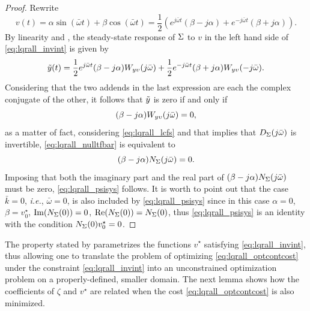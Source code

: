 \begin{proof}
	Rewrite
	\begin{equation}
			v(t) = \alpha \sin(\bar{\omega}t) + \beta \cos(\bar{\omega}t) = \frac{1}{2} \left( e^{j\bar{\omega} t} (\beta - j\alpha) + e^{-j\bar{\omega} t} (\beta + j\alpha) \right).
	\end{equation}
	By linearity and , the steady-state response of $\Sigma$ to $v$ in the left hand side of \eqref{eq:lqrall_invint} is given by
	\begin{equation}
			\tilde{y}(t) = \frac{1}{2} e^{j\bar{\omega} t} (\beta - j\alpha)W_{y\upsilon}(j\bar{\omega}) + \frac{1}{2} e^{-j\bar{\omega} t} (\beta + j\alpha)W_{y\upsilon}(-j\bar{\omega}).
	\end{equation}
	Considering that the two addends in the last expression are each the complex conjugate of the other, it follows that $\tilde{y}$ is zero if and only if
  \begin{equation}
    \label{eq:lqrall_nulltfbar}
    (\beta - j\alpha)W_{y\upsilon}(j\bar{\omega}) = 0,
  \end{equation}
  as a matter of fact, considering \eqref{eq:lqrall_lcfs} and that  implies that $D_\Sigma(j\bar{\omega})$ is invertible, \eqref{eq:lqrall_nulltfbar} is equivalent to
	\begin{equation}
		(\beta - j\alpha)N_\Sigma(j\bar{\omega}) = 0.
	\end{equation}
	Imposing that both the imaginary part and the real part of $(\beta - j\alpha)N_\Sigma(j\bar{\omega})$ must be zero, \eqref{eq:lqrall_psisys} follows.	It is worth to point out that the case $\bar{k}=0$, \emph{i.e.}, $\bar{\omega}=0$, is also included by \eqref{eq:lqrall_psisys} since in this case $\alpha = 0$, $\beta=v_0^\star$, $\operatorname{Im}(N_\Sigma(0))=0$, $\operatorname{Re}(N_\Sigma(0))=N_\Sigma(0)$, thus \eqref{eq:lqrall_psisys} is an identity with the condition $N_\Sigma(0)v_0^\star=0$.
\end{proof}

The property stated by  parametrizes the functions $\hat{v}^\star$ satisfying \eqref{eq:lqrall_invint}, thus allowing one to translate the problem of optimizing \eqref{eq:lqrall_optcontcost} under the constraint \eqref{eq:lqrall_invint} into an unconstrained optimization problem on a properly-defined, smaller domain. The next lemma shows how the coefficients of $\zeta$ and $v^\star$ are related when the cost \eqref{eq:lqrall_optcontcost} is also minimized.

